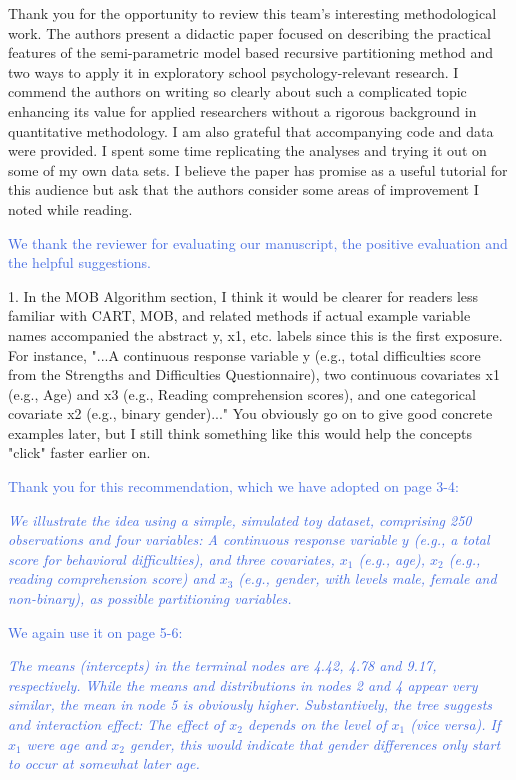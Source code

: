 \documentclass{letter}
\newcommand{\auth}[1]{\textcolor{RoyalBlue}{#1}}
\begin{document}
Thank you for the opportunity to review this team's interesting methodological work. The authors present a didactic paper focused on describing the practical features of the semi-parametric model based recursive partitioning method and two ways to apply it in exploratory school psychology-relevant research. I commend the authors on writing so clearly about such a complicated topic enhancing its value for applied researchers without a rigorous background in quantitative methodology. I am also grateful that accompanying code and data were provided. I spent some time replicating the analyses and trying it out on some of my own data sets. I believe the paper has promise as a useful tutorial for this audience but ask that the authors consider some areas of improvement I noted while reading.

\auth{We thank the reviewer for evaluating our manuscript, the positive evaluation and the helpful suggestions.}

1.      In the MOB Algorithm section, I think it would be clearer for readers less familiar with CART, MOB, and related methods if actual example variable names accompanied the abstract y, x1, etc. labels since this is the first exposure. For instance, "...A continuous response variable y (e.g., total difficulties score from the Strengths and Difficulties Questionnaire), two continuous covariates x1 (e.g., Age) and x3 (e.g., Reading comprehension scores), and one categorical covariate x2 (e.g., binary gender)..." You obviously go on to give good concrete examples later, but I still think something like this would help the concepts "click" faster earlier on.

\auth{Thank you for this recommendation, which we have adopted on page 3-4:}

\auth{\textit{We illustrate the idea using a simple, simulated toy dataset, comprising 250 observations and four variables: A continuous response variable $y$ (e.g., a total score for behavioral difficulties), and three covariates, $x_1$ (e.g., age), $x_2$ (e.g., reading comprehension score) and $x_3$ (e.g., gender, with levels male, female and non-binary), as possible partitioning variables.}}

\auth{We again use it on page 5-6:}

\auth{\textit{The means (intercepts) in the terminal nodes are 4.42, 4.78 and 9.17, respectively. While the means and distributions in nodes 2 and 4 appear very similar, the mean in node 5 is obviously higher. Substantively, the tree suggests and interaction effect: The effect of $x_2$ depends on the level of $x_1$ (vice versa). If $x_1$ were age and $x_2$ gender, this would indicate that gender differences only start to occur at somewhat later age.}}
\end{document}
